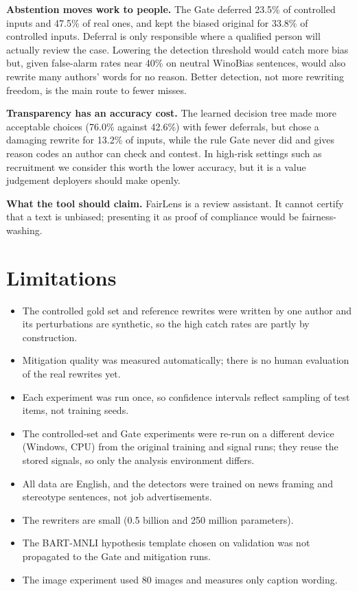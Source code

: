 \documentclass[12pt,a4paper,oneside]{report}
\begin{document}
\textbf{Abstention moves work to people.} The Gate deferred 23.5\% of controlled inputs and 47.5\% of real ones, and kept
the biased original for 33.8\% of controlled inputs. Deferral is only responsible where a qualified person will actually
review the case. Lowering the detection threshold would catch more bias but, given false-alarm rates near 40\% on
neutral WinoBias sentences, would also rewrite many authors' words for no reason. Better detection, not more rewriting
freedom, is the main route to fewer misses.

\textbf{Transparency has an accuracy cost.} The learned decision tree made more acceptable choices (76.0\% against
42.6\%) with fewer deferrals, but chose a damaging rewrite for 13.2\% of inputs, while the rule Gate never did and gives
reason codes an author can check and contest. In high-risk settings such as recruitment we consider this worth the lower
accuracy, but it is a value judgement deployers should make openly.

\textbf{What the tool should claim.} FairLens is a review assistant. It cannot certify that a text is unbiased;
presenting it as proof of compliance would be fairness-washing.

\section{Limitations}\label{sec:limits}
\begin{itemize}
\item The controlled gold set and reference rewrites were written by one author and its perturbations are synthetic, so
the high catch rates are partly by construction.
\item Mitigation quality was measured automatically; there is no human evaluation of the real rewrites yet.
\item Each experiment was run once, so confidence intervals reflect sampling of test items, not training seeds.
\item The controlled-set and Gate experiments were re-run on a different device (Windows, CPU) from the original
training and signal runs; they reuse the stored signals, so only the analysis environment differs.
\item All data are English, and the detectors were trained on news framing and stereotype sentences, not job
advertisements.
\item The rewriters are small (0.5 billion and 250 million parameters).
\item The BART-MNLI hypothesis template chosen on validation was not propagated to the Gate and mitigation runs.
\item The image experiment used 80 images and measures only caption wording.
\end{itemize}
\end{document}
